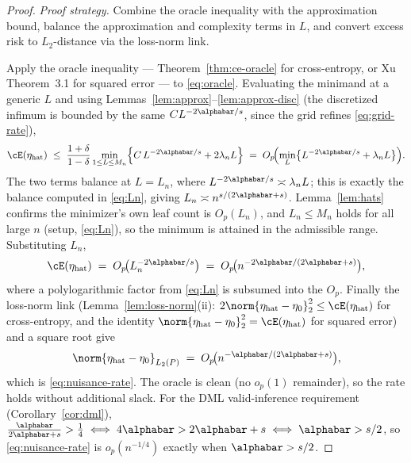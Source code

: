 \begin{proof}
\emph{Proof strategy.} Combine the oracle inequality with the approximation
bound, balance the approximation and complexity terms in $L$, and convert excess
risk to $L_2$-distance via the loss-norm link.

Apply the oracle inequality --- Theorem~\ref{thm:ce-oracle} for cross-entropy,
or Xu Theorem~3.1 for squared error --- to \eqref{eq:oracle}. Evaluating the
minimand at a generic $L$ and using
Lemmas~\ref{lem:approx}--\ref{lem:approx-disc} (the discretized infimum is
bounded by the same $C L^{-2\alphabar/s}$, since the grid refines
\eqref{eq:grid-rate}),
\[
  \cE(\eta_{\text{hat}})
  \;\le\; \frac{1+\delta}{1-\delta}
    \min_{1 \le L \le M_n}
    \Bigl\{ C\, L^{-2\alphabar/s} + 2\lambda_n L \Bigr\}
  \;=\; O_p\!\Bigl( \min_L \bigl\{ L^{-2\alphabar/s} + \lambda_n L \bigr\} \Bigr).
\]
The two terms balance at $L = L_n$, where $L^{-2\alphabar/s} \asymp \lambda_n L$;
this is exactly the balance computed in \eqref{eq:Ln}, giving
$L_n \asymp n^{s/(2\alphabar + s)}$. Lemma~\ref{lem:hats} confirms the
minimizer's own leaf count is $O_p(L_n)$, and $L_n \le M_n$ holds for all large
$n$ (setup, \eqref{eq:Ln}), so the minimum is attained in the admissible range.
Substituting $L_n$,
\[
  \cE(\eta_{\text{hat}})
  \;=\; O_p\!\bigl( L_n^{-2\alphabar/s} \bigr)
  \;=\; O_p\!\bigl( n^{-2\alphabar/(2\alphabar + s)} \bigr),
\]
where a polylogarithmic factor from \eqref{eq:Ln} is subsumed into the
$O_p$. Finally the loss-norm link (Lemma~\ref{lem:loss-norm}(ii):
$2\norm{\eta_{\text{hat}} - \eta_0}_2^2 \le \cE(\eta_{\text{hat}})$ for
cross-entropy, and the identity $\norm{\eta_{\text{hat}} - \eta_0}_2^2 =
\cE(\eta_{\text{hat}})$ for squared error) and a square root give
\[
  \norm{\eta_{\text{hat}} - \eta_0}_{L_2(P)}
  \;=\; O_p\!\bigl( n^{-\alphabar/(2\alphabar + s)} \bigr),
\]
which is \eqref{eq:nuisance-rate}. The oracle is clean (no $o_p(1)$ remainder),
so the rate holds without additional slack. For the DML valid-inference
requirement (Corollary~\ref{cor:dml}),
$\tfrac{\alphabar}{2\alphabar + s} > \tfrac14
\iff 4\alphabar > 2\alphabar + s \iff \alphabar > s/2$, so
\eqref{eq:nuisance-rate} is $o_p(n^{-1/4})$ exactly when $\alphabar > s/2$.
\end{proof}
